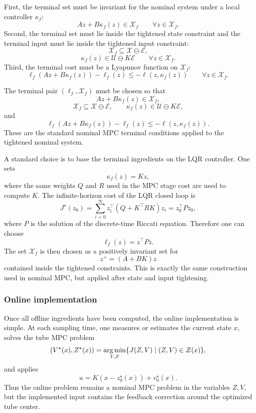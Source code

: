 First, the terminal set must be invariant for the nominal system under a local controller
\(\kappa_f\):
\[
    Az+B\kappa_f(z)\in\mathcal X_f
    \qquad
    \forall z\in\mathcal X_f.
\]
Second, the terminal set must lie inside the tightened state constraint and the terminal input
must lie inside the tightened input constraint:
\[
    \mathcal X_f\subseteq\mathcal X\ominus\mathcal E,
\]
\[
    \kappa_f(z)\in\mathcal U\ominus K\mathcal E
    \qquad
    \forall z\in\mathcal X_f.
\]
Third, the terminal cost must be a Lyapunov function on \(\mathcal X_f\):
\[
    \ell_f(Az+B\kappa_f(z))-\ell_f(z)
    \leq
    -\ell(z,\kappa_f(z))
    \qquad
    \forall z\in\mathcal X_f.
\]

\begin{theorembox}
The terminal pair \((\ell_f,\mathcal X_f)\) must be chosen so that
\[
    Az+B\kappa_f(z)\in\mathcal X_f,
\]
\[
    \mathcal X_f\subseteq\mathcal X\ominus\mathcal E,
    \qquad
    \kappa_f(z)\in\mathcal U\ominus K\mathcal E,
\]
and
\[
    \ell_f(Az+B\kappa_f(z))-\ell_f(z)
    \leq
    -\ell(z,\kappa_f(z)).
\]
These are the standard nominal MPC terminal conditions applied to the tightened nominal
system.
\end{theorembox}

A standard choice is to base the terminal ingredients on the LQR controller. One sets
\[
    \kappa_f(z)=Kz,
\]
where the same weights \(Q\) and \(R\) used in the MPC stage cost are used to compute \(K\).
The infinite-horizon cost of the LQR closed loop is
\[
    J^\star(z_0)
    =
    \sum_{i=0}^{\infty}
    z_i^\top(Q+K^\top RK)z_i
    =
    z_0^\top Pz_0,
\]
where \(P\) is the solution of the discrete-time Riccati equation. Therefore one can choose
\[
    \ell_f(z)=z^\top Pz.
\]
The set \(\mathcal X_f\) is then chosen as a positively invariant set for
\[
    z^+=(A+BK)z
\]
contained inside the tightened constraints. This is exactly the same construction used in
nominal MPC, but applied after state and input tightening.

\subsubsection{Online implementation}

Once all offline ingredients have been computed, the online implementation is simple. At each
sampling time, one measures or estimates the current state \(x\), solves the tube MPC problem
\[
    (V^\star(x),Z^\star(x))
    =
    \operatorname*{arg\,min}_{V,Z}
    \{J(Z,V)\mid (Z,V)\in\mathcal Z(x)\},
\]
and applies
\[
    u=K(x-z_0^\star(x))+v_0^\star(x).
\]
Thus the online problem remains a nominal MPC problem in the variables \(Z,V\), but the
implemented input contains the feedback correction around the optimized tube center.

